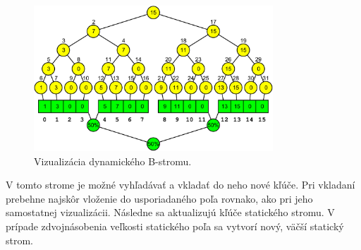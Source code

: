 \begin{figure}
    \centering
    \includegraphics[width=0.8\textwidth]{figures/screenshots/cobtree_overview.pdf}
    \caption[Vizualizácia dynamického \obliv B-stromu]{Vizualizácia dynamického \obliv B-stromu.}
    \label{fig:ss_cobtree}
\end{figure}

V tomto strome je možné vyhľadávať a vkladať do neho nové kľúče. Pri vkladaní prebehne najskôr vloženie do usporiadaného poľa rovnako, ako pri jeho samostatnej vizualizácii. Následne sa aktualizujú kľúče statického stromu. V prípade zdvojnásobenia veľkosti statického poľa sa vytvorí nový, väčší statický strom.



